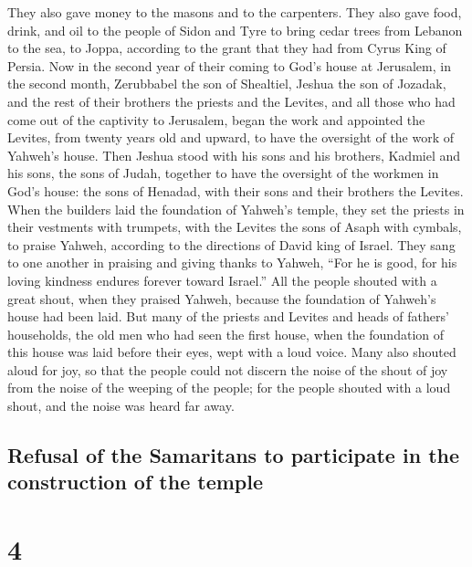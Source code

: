  They also gave money to the masons and to the carpenters.
They also gave food, drink, and oil to the people of Sidon and Tyre to
bring cedar trees from Lebanon to the sea, to Joppa, according to the
grant that they had from Cyrus King of Persia.  Now in the
second year of their coming to God's house at Jerusalem, in the second
month, Zerubbabel the son of Shealtiel, Jeshua the son of Jozadak, and
the rest of their brothers the priests and the Levites, and all those
who had come out of the captivity to Jerusalem, began the work and
appointed the Levites, from twenty years old and upward, to have the
oversight of the work of Yahweh's house.  Then Jeshua
stood with his sons and his brothers, Kadmiel and his sons, the sons of
Judah, together to have the oversight of the workmen in God's house: the
sons of Henadad, with their sons and their brothers the Levites.
 When the builders laid the foundation of Yahweh's
temple, they set the priests in their vestments with trumpets, with the
Levites the sons of Asaph with cymbals, to praise Yahweh, according to
the directions of David king of Israel.  They sang to one
another in praising and giving thanks to Yahweh, ``For he is good, for
his loving kindness endures forever toward Israel.'' All the people
shouted with a great shout, when they praised Yahweh, because the
foundation of Yahweh's house had been laid.  But many of
the priests and Levites and heads of fathers' households, the old men
who had seen the first house, when the foundation of this house was laid
before their eyes, wept with a loud voice. Many also shouted aloud for
joy,  so that the people could not discern the noise of
the shout of joy from the noise of the weeping of the people; for the
people shouted with a loud shout, and the noise was heard far away.

\hypertarget{refusal-of-the-samaritans-to-participate-in-the-construction-of-the-temple}{%
\subsection{Refusal of the Samaritans to participate in the construction
of the
temple}\label{refusal-of-the-samaritans-to-participate-in-the-construction-of-the-temple}}

\hypertarget{section-3}{%
\section{4}\label{section-3}}

